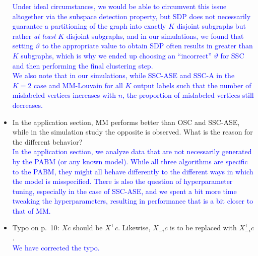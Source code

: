 \documentclass[
]{article}
\begin{document}
\begin{itemize}
  \textcolor{blue}{
  Under ideal circumstances, we would be able to circumvent this issue altogether via the subspace detection property, but SDP does not necessarily guarantee a partitioning of the graph into exactly $K$ disjoint subgraphs but rather {\em at least} $K$ disjoint subgraphs, and in our simulations, we found that setting $\vartheta$ to the appropriate value to obtain SDP often results in greater than $K$ subgraphs, which is why we ended up choosing an ``incorrect'' $\vartheta$ for SSC and then performing the final clustering step.
  }\\
  \textcolor{blue}{
  We also note that in our simulations, while SSC-ASE and SSC-A in the $K = 2$ case and MM-Louvain for all $K$ output labels such that the number of mislabeled vertices increases with $n$, the proportion of mislabeled vertices still decreases.
  }
\item
  In the application section, MM performs better than OSC and SSC-ASE,
  while in the simulation study the opposite is observed. What is the
  reason for the different behavior?\\
  \textcolor{blue}{
  In the application section, we analyze data that are not necessarily generated by the PABM (or any known model). 
  While all three algorithms are specific to the PABM, they might all behave differently to the different ways in which the model is misspecified. 
  There is also the question of hyperparameter tuning, especially in the case of SSC-ASE, and we spent a bit more time tweaking the hyperparameters, resulting in performance that is a bit closer to that of MM. 
  }
\item
  Typo on p.~10: \(X c\) should be \(X^\top c\). Likewise, \(X_{-i} c\)
  is to be replaced with \(X_{-i}^\top c\).\\
  \textcolor{blue}{
  We have corrected the typo.
  }
\end{itemize}

\newpage

  
\end{document}
